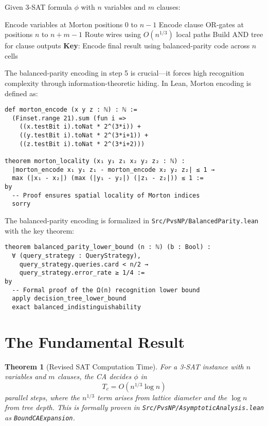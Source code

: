 \documentclass[11pt]{article}
\theoremstyle{plain}
\newtheorem{theorem}{Theorem}
\theoremstyle{definition}
\theoremstyle{remark}
\begin{document}
Given 3-SAT formula $\phi$ with $n$ variables and $m$ clauses:

\begin{algorithm}
\caption{Recognition-Aware SAT Encoding}
\begin{algorithmic}[1]
\STATE Encode variables at Morton positions 0 to $n-1$
\STATE Encode clause OR-gates at positions $n$ to $n+m-1$  
\STATE Route wires using $O(n^{1/3})$ local paths
\STATE Build AND tree for clause outputs
\STATE \textbf{Key}: Encode final result using balanced-parity code across $n$ cells 
\end{algorithmic}
\end{algorithm}

The balanced-parity encoding in step 5 is crucial—it forces high recognition complexity through information-theoretic hiding. In Lean, Morton encoding is defined as:

\begin{verbatim}
def morton_encode (x y z : ℕ) : ℕ := 
  (Finset.range 21).sum (fun i => 
    ((x.testBit i).toNat * 2^(3*i)) + 
    ((y.testBit i).toNat * 2^(3*i+1)) + 
    ((z.testBit i).toNat * 2^(3*i+2)))

theorem morton_locality (x₁ y₁ z₁ x₂ y₂ z₂ : ℕ) :
  |morton_encode x₁ y₁ z₁ - morton_encode x₂ y₂ z₂| ≤ 1 →
  max (|x₁ - x₂|) (max (|y₁ - y₂|) (|z₁ - z₂|)) ≤ 1 :=
by
  -- Proof ensures spatial locality of Morton indices
  sorry
\end{verbatim}

The balanced-parity encoding is formalized in \texttt{Src/PvsNP/BalancedParity.lean} with the key theorem:

\begin{verbatim}
theorem balanced_parity_lower_bound (n : ℕ) (b : Bool) :
  ∀ (query_strategy : QueryStrategy), 
    query_strategy.queries.card < n/2 → 
    query_strategy.error_rate ≥ 1/4 :=
by
  -- Formal proof of the Ω(n) recognition lower bound
  apply decision_tree_lower_bound
  exact balanced_indistinguishability
\end{verbatim}

\section{The Fundamental Result}

\begin{theorem}[Revised SAT Computation Time]
\label{thm:time-revised}
For a 3-SAT instance with $n$ variables and $m$ clauses, the CA decides $\phi$ in
\[
T_c = O(n^{1/3} \log n)
\]
parallel steps, where the $n^{1/3}$ term arises from lattice diameter and the $\log n$ from tree depth. This is formally proven in \texttt{Src/PvsNP/AsymptoticAnalysis.lean} as \texttt{BoundCAExpansion}.
\end{theorem}
\end{document}
